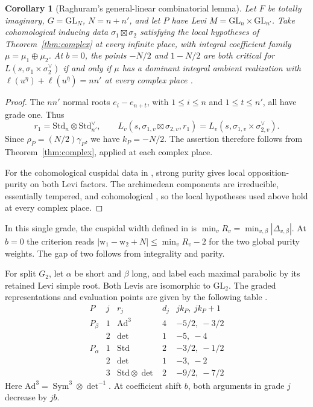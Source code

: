 \documentclass[12pt]{amsart}
\numberwithin{equation}{section}
\theoremstyle{plain}
\newtheorem{corollary}[theorem]{Corollary}
\theoremstyle{definition}
\theoremstyle{remark}
\renewcommand{\bar}{\overline}
\newcommand{\GL}{\mathrm{GL}}
\newcommand{\Sym}{\operatorname{Sym}}
\newcommand{\Std}{\mathrm{Std}}
\newcommand{\Ad}{\mathrm{Ad}}
\begin{document}
\begin{corollary}[Raghuram's general-linear combinatorial lemma]\label{cor:Raghuram}
Let $F$ be totally imaginary, $G=\GL_N$, $N=n+n'$, and let $P$ have Levi $M=\GL_n\times\GL_{n'}$. Take cohomological inducing data $\sigma_1\boxtimes\sigma_2$ satisfying the local hypotheses of Theorem~\ref{thm:complex} at every infinite place, with integral coefficient family $\mu=\mu_1\oplus\mu_2$. At $b=0$, the points $-N/2$ and $1-N/2$ are both critical for $L(s,\sigma_1\times\sigma_2^\vee)$ if and only if $\mu$ has a dominant integral ambient realization with $\ell(u^\eta)+\ell(u^{\bar\eta})=nn'$ at every complex place \cite[Lemma~3.16]{Raghuram2025}. 
\end{corollary}

\begin{proof}
The $nn'$ normal roots $e_i-e_{n+t}$, with $1\le i\le n$ and $1\le t\le n'$, all have grade one. Thus
\[
 r_1=\Std_n\otimes\Std_{n'}^\vee,\qquad
 L_v(s,\sigma_{1,v}\boxtimes\sigma_{2,v},r_1)
 =L_v(s,\sigma_{1,v}\times\sigma_{2,v}^\vee).
\]
Since $\rho_P=(N/2)\gamma_P$, we have $k_P=-N/2$. The assertion therefore follows from Theorem~\ref{thm:complex}, applied at each complex place.

For the cohomological cuspidal data in \cite[Lemma~3.16]{Raghuram2025}, strong purity gives local opposition-purity on both Levi factors. The archimedean components are irreducible, essentially tempered, and cohomological \cite[\S2.5, Prop.~2.13]{Raghuram2025}, so the local hypotheses used above hold at every complex place.
\end{proof}

In this single grade, the cuspidal width defined in \cite[(3.11)]{Raghuram2025} is $\min_v R_v=\min_{v,\beta}|\Delta_{v,\beta}|$. At $b=0$ the criterion reads $|\mathrm{w}_1-\mathrm{w}_2+N|\le\min_v R_v-2$ for the two global purity weights. The gap of two follows from integrality and parity. 

For split $G_2$, let $\alpha$ be short and $\beta$ long, and label each maximal parabolic by its retained Levi simple root. Both Levis are isomorphic to $\GL_2$. The graded representations and evaluation points are given by the following table \cite[\S\S3.1--3.2]{HosseiniJafariG2}.
\begin{equation}\label{eq:g2-tuple}
\begin{array}{c|c|c|c|c}
 P&j&r_j&d_j&jk_P,\ jk_P+1\\ \hline
 P_\beta&1&\Ad^3&4&-5/2,\ -3/2\\
        &2&\det&1&-5,\ -4\\ \hline
 P_\alpha&1&\Std&2&-3/2,\ -1/2\\
         &2&\det&1&-3,\ -2\\
         &3&\Std\otimes\det&2&-9/2,\ -7/2
\end{array}
\end{equation}
Here $\Ad^3=\Sym^3\otimes\det^{-1}$. At coefficient shift $b$, both arguments in grade $j$ decrease by $jb$. 
\end{document}
